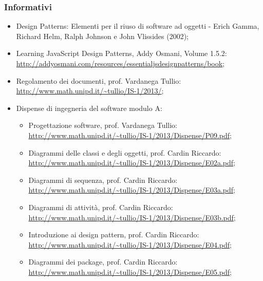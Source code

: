 \subsubsection{Informativi}
\begin{itemize}
\item Design Patterns: Elementi per il riuso di software ad oggetti - Erich Gamma,
Richard Helm, Ralph Johnson e John Vlissides (2002);

\item Learning JavaScript Design Patterns, Addy Osmani, Volume 1.5.2:\\
\url{http://addyosmani.com/resources/essentialjsdesignpatterns/book};

\item Regolamento dei documenti, prof. Vardanega Tullio:\\
\url{http://www.math.unipd.it/~tullio/IS-1/2013/};

\item Dispense di ingegneria del software modulo A:
\begin{itemize}
\item Progettazione software, prof. Vardanega Tullio:\\
\url{http://www.math.unipd.it/~tullio/IS-1/2013/Dispense/P09.pdf};

\item Diagrammi delle classi e degli oggetti, prof. Cardin Riccardo:\\
\url{http://www.math.unipd.it/~tullio/IS-1/2013/Dispense/E02a.pdf};

\item Diagrammi di sequenza, prof. Cardin Riccardo:\\
\url{http://www.math.unipd.it/~tullio/IS-1/2013/Dispense/E03a.pdf};

\item Diagrammi di attività, prof. Cardin Riccardo:\\
\url{http://www.math.unipd.it/~tullio/IS-1/2013/Dispense/E03b.pdf};

\item Introduzione ai design pattern, prof. Cardin Riccardo:\\
\url{http://www.math.unipd.it/~tullio/IS-1/2013/Dispense/E04.pdf};

\item Diagrammi dei package, prof. Cardin Riccardo:\\
\url{http://www.math.unipd.it/~tullio/IS-1/2013/Dispense/E05.pdf};
\end{itemize}



\end{itemize}
